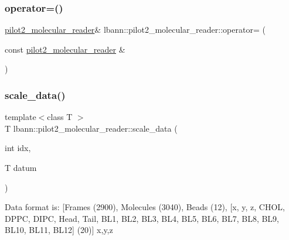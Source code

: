 \subsubsection{\texorpdfstring{operator=()}{operator=()}}
{\footnotesize\ttfamily \hyperlink{classlbann_1_1pilot2__molecular__reader}{pilot2\+\_\+molecular\+\_\+reader}\& lbann\+::pilot2\+\_\+molecular\+\_\+reader\+::operator= (\begin{DoxyParamCaption}\item[{const \hyperlink{classlbann_1_1pilot2__molecular__reader}{pilot2\+\_\+molecular\+\_\+reader} \&}]{ }\end{DoxyParamCaption})\hspace{0.3cm}{\ttfamily [default]}}

\mbox{\label{classlbann_1_1pilot2__molecular__reader_add998998fa16444e4509b08f79b291da}} 
\subsubsection{\texorpdfstring{scale\+\_\+data()}{scale\_data()}}
{\footnotesize\ttfamily template$<$class T $>$ \\
T lbann\+::pilot2\+\_\+molecular\+\_\+reader\+::scale\+\_\+data (\begin{DoxyParamCaption}\item[{int}]{idx,  }\item[{T}]{datum }\end{DoxyParamCaption})\hspace{0.3cm}{\ttfamily [inline]}}

Data format is\+: \mbox{[}Frames (2900), Molecules (3040), Beads (12), \mbox{[}\textquotesingle{}x\textquotesingle{}, \textquotesingle{}y\textquotesingle{}, \textquotesingle{}z\textquotesingle{}, \textquotesingle{}C\+H\+OL\textquotesingle{}, \textquotesingle{}D\+P\+PC\textquotesingle{}, \textquotesingle{}D\+I\+PC\textquotesingle{}, \textquotesingle{}Head\textquotesingle{}, \textquotesingle{}Tail\textquotesingle{}, \textquotesingle{}B\+L1\textquotesingle{}, \textquotesingle{}B\+L2\textquotesingle{}, \textquotesingle{}B\+L3\textquotesingle{}, \textquotesingle{}B\+L4\textquotesingle{}, \textquotesingle{}B\+L5\textquotesingle{}, \textquotesingle{}B\+L6\textquotesingle{}, \textquotesingle{}B\+L7\textquotesingle{}, \textquotesingle{}B\+L8\textquotesingle{}, \textquotesingle{}B\+L9\textquotesingle{}, \textquotesingle{}B\+L10\textquotesingle{}, \textquotesingle{}B\+L11\textquotesingle{}, \textquotesingle{}B\+L12\textquotesingle{}\mbox{]} (20)\mbox{]} x,y,z 

